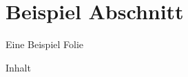 
\section{Beispiel Abschnitt}
\label{sec:some}

\begin{frame}{Eine Beispiel Folie}
	
Inhalt
	
\end{frame}
